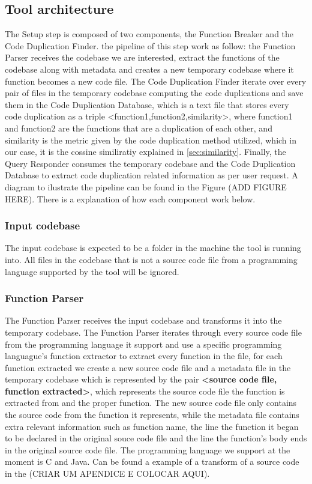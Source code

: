 \en

\subsection{Tool architecture}
\label{subsec:architecture}

The Setup step is composed of two components, the Function Breaker and the Code Duplication Finder. the pipeline of this step work as
follow: the Function Parser receives the codebase we are interested, extract the functions of the codebase along with metadata and
creates a new temporary codebase where it function becomes a new code file. The Code Duplication Finder iterate over every pair of 
files in the temporary codebase computing the code duplications and save them in the Code Duplication Database, which is a text file
that stores every code duplication as a triple <function1,function2,similarity>, where function1 and function2 are the functions that 
are a duplication of each other, and similarity is the metric given by the code duplication method utilized, which in our case, it is
the cossine similiratiy explained in \ref{sec:similarity}. Finally, the Query Responder consumes the temporary codebase and the 
Code Duplication Database to extract code duplication related information as per user request. A diagram to ilustrate the pipeline
can be found in the Figure (ADD FIGURE HERE). There is a explanation of how each component work below.

\subsubsection{Input codebase}

The input codebase is expected to be a folder in the machine the tool is running into. All files in the codebase that is not a source
code file from a programming language supported by the tool will be ignored.

\subsubsection{Function Parser}

The Function Parser receives the input codebase and transforms it into the temporary codebase. The Function Parser iterates through
every source code file from the programming language it support and use a specific programming languague's function 
extractor to extract
every function in the file, for each function extracted we create a new source code file and a metadata file in the temporary codebase
which is represented by the pair \textbf{<source code file, function extracted>}, which represents the source code file the 
function is extracted from and the 
proper function. The new source code file only contains the source code from the function it represents, while the metadata file 
contains extra relevant information such as function name, the line the function it began to be declared in the original souce code 
file and the line the function's body ends in the original source code file. The programming language we support at the moment 
is C and Java. Can be found a example of a transform of a source code in the (CRIAR UM APENDICE E COLOCAR AQUI).

